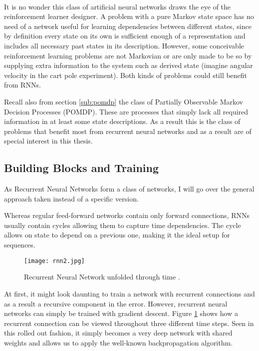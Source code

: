 \paragraph{}
It is no wonder this class of artificial neural networks
draws the eye of the reinforcement learner designer.
A problem with a pure Markov state space
has no need of a network useful for learning dependencies between different states,
since by definition every state on its own is sufficient enough of a representation
and includes all necessary past states in its description.
However, some conceivable reinforcement learning problems
are not Markovian
or are only made to be so
by supplying extra information to the system
such as derived state
(imagine angular velocity in the cart pole experiment).
Both kinds of problems
could still benefit from RNNs.

Recall also from section \ref{sub:pomdp}
the class of Partially Observable Markov Decision Processes (POMDP).
These are processes that simply lack all required information in
at least some state descriptions.
As a result this is the class of problems that benefit most
from recurrent neural networks
and as a result are of special interest in this thesis.

\subsection{Building Blocks and Training}
\label{sub:building_blocks_and_training}
As Recurrent Neural Networks form a class of networks,
I will go over the general approach taken instead of a specific version.

Whereas regular feed-forward networks contain only forward connections,
RNNs usually contain cycles allowing them to capture time dependencies.
The cycle allows on state to depend on a previous one,
making it the ideal setup for sequences.

\begin{figure}[htpb]
  \centering
  \texttt{[image: rnn2.jpg]}
  \caption[Recurrent neural network time unfolding]{
    Recurrent Neural Network unfolded through time
    \parencite{Y.2015dl}.
  }
  \label{fig:rnn}
\end{figure}

At first, it might look daunting to train a network with recurrent connections
and as a result a recursive component in the error.
However, recurrent neural networks can simply be trained with gradient descent.
Figure \ref{fig:rnn} shows how a recurrent connection can be viewed
throughout three different time steps.
Seen in this rolled out fashion,
it simply becomes a very deep network with shared weights
and allows us to apply the well-known backpropagation algorithm.

